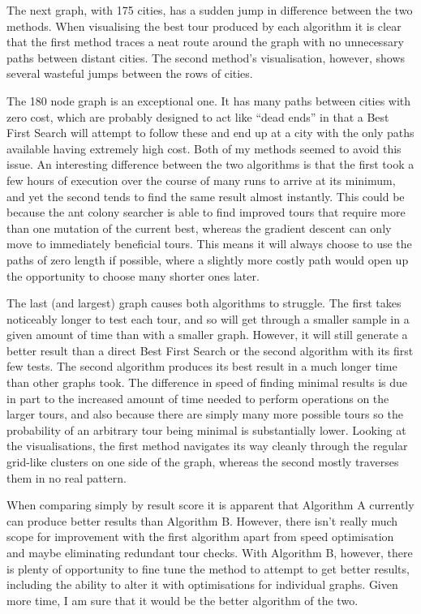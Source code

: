 \documentclass[a4paper,11pt]{article}
\begin{document}
The next graph, with 175 cities, has a sudden jump in difference between the
two methods. When visualising the best tour produced by each algorithm it is
clear that the first method traces a neat route around the graph with no
unnecessary paths between distant cities. The second method's visualisation,
however, shows several wasteful jumps between the rows of cities.

The 180 node graph is an exceptional one. It has many paths between cities with
zero cost, which are probably designed to act like ``dead ends'' in that a
Best First Search will attempt to follow these and end up at a city with the
only paths available having extremely high cost. Both of my methods seemed to
avoid this issue. An interesting difference between the two algorithms
is that the first took a few hours of execution over the course of many runs to 
arrive at its minimum, and yet the second tends to find the same result almost
instantly. This could be because the ant colony searcher is able to find
improved tours that require more than one mutation of the current best, whereas
the gradient descent can only move to immediately beneficial tours. This means
it will always choose to use the paths of zero length if possible, where a
slightly more costly path would open up the opportunity to choose many shorter
ones later.

The last (and largest) graph causes both algorithms to struggle. The first
takes noticeably longer to test each tour, and so will get through a smaller
sample in a given amount of time than with a smaller graph. However, it will
still generate a better result than a direct Best First Search or the second
algorithm with its first few tests. The second algorithm produces its best
result in a much longer time than other graphs took. The difference in speed of
finding minimal results is due in part to the increased amount of time needed
to perform operations on the larger tours, and also because there are simply
many more possible tours so the probability of an arbitrary tour being minimal
is substantially lower. Looking at the visualisations, the first method
navigates its way cleanly through the regular grid-like clusters on one side of
the graph, whereas the second mostly traverses them in no real pattern.

When comparing simply by result score it is apparent that Algorithm A currently
can produce better results than Algorithm B. However, there isn't really much
scope for improvement with the first algorithm apart from speed optimisation
and maybe eliminating redundant tour checks. With Algorithm B, however, there
is plenty of opportunity to fine tune the method to attempt to get better
results, including the ability to alter it with optimisations for individual
graphs. Given more time, I am sure that it would be the better algorithm of the
two.
\end{document}
